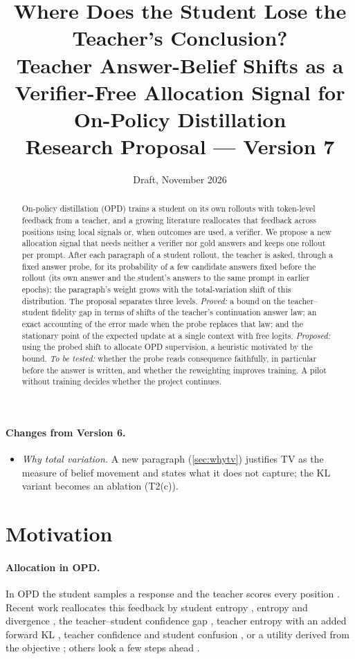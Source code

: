 \documentclass[11pt]{article}
\title{\textbf{Where Does the Student Lose the Teacher's Conclusion?}\\[4pt]
\large Teacher Answer-Belief Shifts as a Verifier-Free Allocation Signal for On-Policy Distillation\\[2pt]
\normalsize Research Proposal --- Version 7}
\author{\todo{Author names}}
\date{Draft, November 2026}
\theoremstyle{definition}
\theoremstyle{remark}
\newcommand{\TV}{\mathrm{TV}}
\begin{document}
\maketitle

\begin{abstract}
On-policy distillation (OPD) trains a student on its own rollouts with token-level feedback from a teacher, and a growing literature reallocates that feedback across positions using local signals or, when outcomes are used, a verifier. We propose a new allocation signal that needs neither a verifier nor gold answers and keeps one rollout per prompt. After each paragraph of a student rollout, the teacher is asked, through a fixed answer probe, for its probability of a few candidate answers fixed before the rollout (its own answer and the student's answers to the same prompt in earlier epochs); the paragraph's weight grows with the total-variation shift of this distribution. The proposal separates three levels. \emph{Proved:} a bound on the teacher--student fidelity gap in terms of shifts of the teacher's continuation answer law; an exact accounting of the error made when the probe replaces that law; and the stationary point of the expected update at a single context with free logits. \emph{Proposed:} using the probed shift to allocate OPD supervision, a heuristic motivated by the bound. \emph{To be tested:} whether the probe reads consequence faithfully, in particular before the answer is written, and whether the reweighting improves training. A pilot without training decides whether the project continues.
\end{abstract}

\paragraph{Changes from Version 6.}
\begin{itemize}[itemsep=1pt,topsep=2pt]
\item \emph{Why total variation.} A new paragraph (\cref{sec:whytv}) justifies $\TV$ as the measure of belief movement and states what it does not capture; the KL variant becomes an ablation (T2(c)).
\end{itemize}

\section{Motivation}
\label{sec:motivation}

\paragraph{Allocation in OPD.}
In OPD the student samples a response and the teacher scores every position \citep{agarwal2024gkd,gu2024minillm,lu2025opd}. Recent work reallocates this feedback by student entropy \citep{tavor2026rethinking}, entropy and divergence \citep{xu2026tip}, the teacher--student confidence gap \citep{kim2026tsdkd}, teacher entropy with an added forward KL \citep{jin2026eopd}, teacher confidence and student confusion \citep{li2026fire}, or a utility derived from the objective \citep{fuw2026}; others look a few steps ahead \citep{jiang2026topd,liu2026sfd,hou2026dash}.
\end{document}
